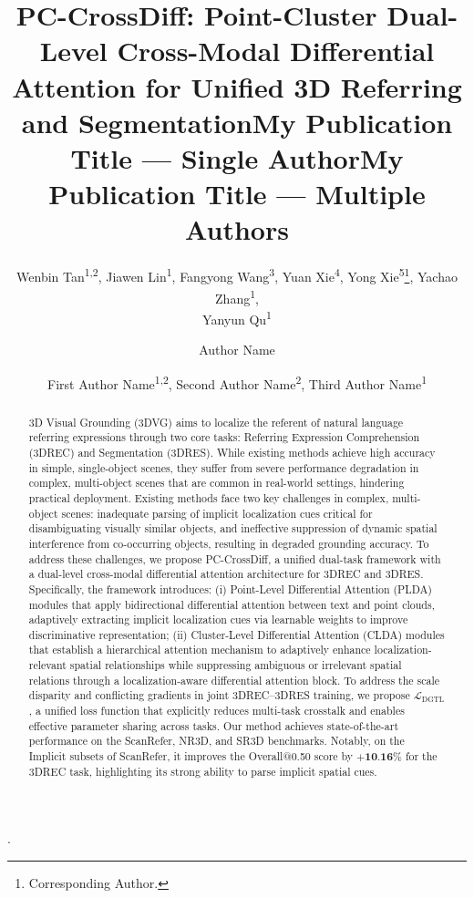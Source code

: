 \documentclass[letterpaper]{article} %
\title{PC-CrossDiff: Point-Cluster Dual-Level Cross-Modal Differential Attention for Unified 3D Referring and Segmentation}
\author{
	Wenbin Tan\textsuperscript{\rm 1,\rm 2},
	Jiawen Lin\textsuperscript{\rm 1}, 
	Fangyong Wang\textsuperscript{\rm 3},
	Yuan Xie\textsuperscript{\rm 4},
	Yong Xie\textsuperscript{\rm 5}\thanks{Corresponding Author.},
	Yachao Zhang\textsuperscript{\rm 1}\footnotemark[\value{footnote}], \\
	Yanyun Qu\textsuperscript{\rm 1}
}
\title{My Publication Title --- Single Author}
\author {
    Author Name
}
\title{My Publication Title --- Multiple Authors}
\author {
    First Author Name\textsuperscript{\rm 1,\rm 2},
    Second Author Name\textsuperscript{\rm 2},
    Third Author Name\textsuperscript{\rm 1}
}
\begin{document}
\maketitle

\begin{abstract}
3D Visual Grounding (3DVG) aims to localize the referent of natural language referring expressions through two core tasks: Referring Expression Comprehension (3DREC) and Segmentation (3DRES). While existing methods achieve high accuracy in simple, single-object scenes, they suffer from severe performance degradation in complex, multi-object scenes that are common in real-world settings, hindering practical deployment. Existing methods face two key challenges in complex, multi-object scenes: inadequate parsing of implicit localization cues critical for disambiguating visually similar objects, and ineffective suppression of dynamic spatial interference from co-occurring objects, resulting in degraded grounding accuracy. To address these challenges, we propose PC-CrossDiff, a unified dual-task framework with a dual-level cross-modal differential attention architecture for 3DREC and 3DRES. Specifically, the framework introduces: (i) Point-Level Differential Attention (PLDA) modules that apply bidirectional differential attention between text and point clouds, adaptively extracting implicit localization cues via learnable weights to improve discriminative representation; (ii) Cluster-Level Differential Attention (CLDA) modules that establish a hierarchical attention mechanism to adaptively enhance localization-relevant spatial relationships while suppressing ambiguous or irrelevant spatial relations through a localization-aware differential attention block. To address the scale disparity and conflicting gradients in joint 3DREC–3DRES training, we propose $\mathcal{L}_{\text{DGTL}}$, a unified loss function that explicitly reduces multi-task crosstalk and enables effective parameter sharing across tasks. Our method achieves state-of-the-art performance on the ScanRefer, NR3D, and SR3D benchmarks. Notably, on the Implicit subsets of ScanRefer, it improves the Overall@0.50 score by $\textbf{+10.16\%}$ for the 3DREC task, highlighting its strong ability to parse implicit spatial cues.

\end{abstract}

\begin{links}
	.
\end{links}
\end{document}
